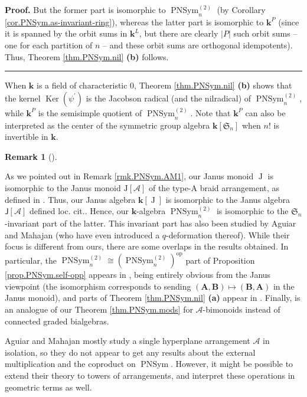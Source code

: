 \documentclass[numbers=enddot,12pt,final,onecolumn,notitlepage]{scrartcl}%
\theoremstyle{definition}
\newtheorem{remk}[theo]{Remark}
\newenvironment{remark}[1][]
{\begin{remk}[#1]\begin{leftbar}}
{\end{leftbar}\end{remk}}
\newenvironment{proof}[1][Proof]{\noindent\textbf{#1.} }{\ \rule{0.5em}{0.5em}}
\begin{document}
\begin{proof}
But the former part is isomorphic to $\operatorname*{PNSym}\nolimits_{n}%
^{\left(  2\right)  }$ (by Corollary \ref{cor.PNSym.as-invariant-ring}),
whereas the latter part is isomorphic to $\mathbf{k}^{P}$ (since it is spanned
by the orbit sums in $\mathbf{k}^{L}$, but there are clearly $\left\vert
P\right\vert $ such orbit sums -- one for each partition of $n$ -- and these
orbit sums are orthogonal idempotents). Thus, Theorem \ref{thm.PNSym.nil}
\textbf{(b)} follows.
\end{proof}

When $\mathbf{k}$ is a field of characteristic $0$, Theorem
\ref{thm.PNSym.nil} \textbf{(b)} shows that the kernel $\operatorname*{Ker}%
\left(  \psi^{\prime}\right)  $ is the Jacobson radical (and the nilradical)
of $\operatorname*{PNSym}\nolimits_{n}^{\left(  2\right)  }$, while
$\mathbf{k}^{P}$ is the semisimple quotient of $\operatorname*{PNSym}%
\nolimits_{n}^{\left(  2\right)  }$. Note that $\mathbf{k}^{P}$ can also be
interpreted as the center of the symmetric group algebra $\mathbf{k}\left[
\mathfrak{S}_{n}\right]  $ when $n!$ is invertible in $\mathbf{k}$.

\begin{remark}
As we pointed out in Remark \ref{rmk.PNSym.AM1}, our Janus monoid
$\operatorname*{J}$ is isomorphic to the Janus monoid $\mathrm{J}\left[
\mathcal{A}\right]  $ of the type-A braid arrangement, as defined in
\cite[\S 1.9.3]{AguMah20}. Thus, our Janus algebra $\mathbf{k}\left[
\operatorname*{J}\right]  $ is isomorphic to the Janus algebra $\mathsf{J}%
\left[  \mathcal{A}\right]  $ defined loc. cit.. Hence, our $\mathbf{k}%
$-algebra $\operatorname*{PNSym}\nolimits_{n}^{\left(  2\right)  }$ is
isomorphic to the $\mathfrak{S}_{n}$-invariant part of the latter. This
invariant part has also been studied by Aguiar and Mahajan \cite[\S 1.12.3]%
{AguMah22} (who have even introduced a $q$-deformation thereof). While their
focus is different from ours, there are some overlaps in the results obtained.
In particular, the $\operatorname*{PNSym}\nolimits_{n}^{\left(  2\right)
}\cong\left(  \operatorname*{PNSym}\nolimits_{n}^{\left(  2\right)  }\right)
^{\operatorname*{op}}$ part of Proposition \ref{prop.PNSym.self-opp} appears
in \cite{AguMah22}, being entirely obvious from the Janus viewpoint (the
isomorphism corresponds to sending $\left(  \mathbf{A},\mathbf{B}\right)
\mapsto\left(  \mathbf{B},\mathbf{A}\right)  $ in the Janus monoid), and parts
of Theorem \ref{thm.PNSym.nil} \textbf{(a)} appear in \cite[\S 1.12.4]%
{AguMah22}. Finally, \cite[Proposition 11.6]{AguMah20} is an analogue of our
Theorem \ref{thm.PNSym.mods} for $\mathcal{A}$-bimonoids instead of connected
graded bialgebras.

Aguiar and Mahajan mostly study a single hyperplane arrangement $\mathcal{A}$
in isolation, so they do not appear to get any results about the external
multiplication and the coproduct on $\operatorname*{PNSym}$. However, it might
be possible to extend their theory to towers of arrangements, and interpret
these operations in geometric terms as well.
\end{remark}
\end{document}
